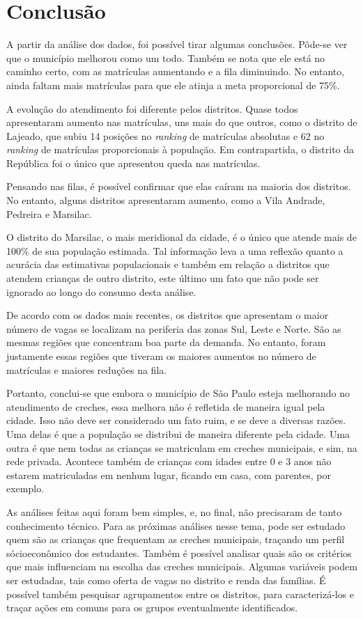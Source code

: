\chapter{Conclusão}

\lettrine{A}{} partir da análise dos dados, foi possível tirar algumas conclusões. Pôde-se ver que o município melhorou como um todo. Também se nota que ele está no caminho certo, com as matrículas aumentando e a fila diminuindo. No entanto, ainda faltam mais matrículas para que ele atinja a meta proporcional de 75\%.

A evolução do atendimento foi diferente pelos distritos. Quase todos apresentaram aumento nas matrículas, uns mais do que outros, como o distrito de Lajeado, que subiu 14 posições no \textit{ranking} de matrículas absolutas e 62 no \textit{ranking} de matrículas proporcionais à população. Em contrapartida, o distrito da República foi o único que apresentou queda nas matrículas.

Pensando nas filas, é possível confirmar que elas caíram na maioria dos distritos. No entanto, alguns distritos apresentaram aumento, como a Vila Andrade, Pedreira e Marsilac.

O distrito do Marsilac, o mais meridional da cidade, é o único que atende mais de 100\% de sua população estimada. Tal informação leva a uma reflexão quanto a acurácia das estimativas populacionais e também em relação a distritos que atendem crianças de outro distrito, este último um fato que não pode ser ignorado ao longo do consumo desta análise.

De acordo com os dados mais recentes, os distritos que apresentam o maior número de vagas se localizam na periferia das zonas Sul, Leste e Norte. São as mesmas regiões que concentram boa parte da demanda. No entanto, foram justamente essas regiões que tiveram os maiores aumentos no número de matrículas e maiores reduções na fila.

Portanto, conclui-se que embora o município de São Paulo esteja melhorando no atendimento de creches, essa melhora não é refletida de maneira igual pela cidade. Isso não deve ser considerado um fato ruim, e se deve a diversas razões. Uma delas é que a população se distribui de maneira diferente pela cidade. Uma outra é que nem todas as crianças se matriculam em creches municipais, e sim, na rede privada. Acontece também de crianças com idades entre 0 e 3 anos não estarem matriculadas em nenhum lugar, ficando em casa, com parentes, por exemplo.

As análises feitas aqui foram bem simples, e, no final, não precisaram de tanto conhecimento técnico. Para as próximas análises nesse tema, pode ser estudado quem são as crianças que frequentam as creches municipais, traçando um perfil sócioeconômico dos estudantes. Também é possível analisar quais são os critérios que mais influenciam na escolha das creches municipais. Algumas variáveis podem ser estudadas, tais como oferta de vagas no distrito e renda das famílias. É possível também pesquisar agrupamentos entre os distritos, para caracterizá-los e traçar ações em comuns para os grupos eventualmente identificados. 

